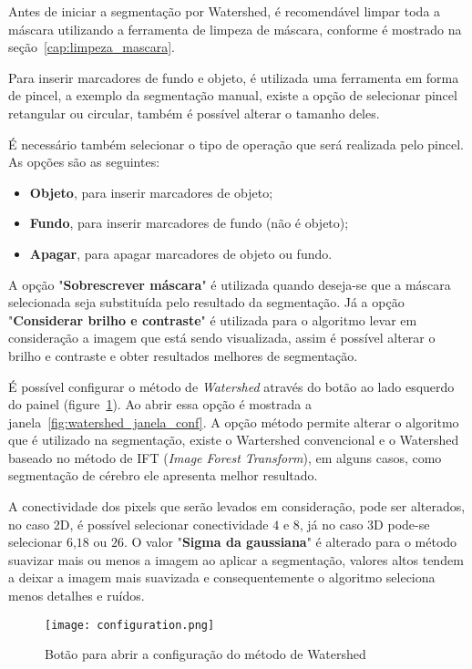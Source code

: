Antes de iniciar a segmentação por Watershed, é recomendável limpar toda a máscara utilizando a ferramenta de limpeza de máscara, conforme é mostrado na seção~\ref{cap:limpeza_mascara}.

Para inserir marcadores de fundo e objeto, é utilizada uma ferramenta em forma de pincel, a exemplo da segmentação manual, existe a opção de selecionar pincel retangular ou circular, também é possível alterar o tamanho deles. 

É necessário também selecionar o tipo de operação que será realizada pelo pincel. As opções são as
seguintes:
\begin{itemize}
\item \textbf{Objeto}, para inserir marcadores de objeto;
\item \textbf{Fundo}, para inserir marcadores de fundo (não é objeto);
\item \textbf{Apagar}, para apagar marcadores de objeto ou fundo.
\end{itemize}

A opção "\textbf{Sobrescrever máscara}" é utilizada quando deseja-se que a máscara selecionada seja substituída pelo resultado da segmentação. Já a opção "\textbf{Considerar brilho e contraste}" é utilizada para o algoritmo levar em consideração a imagem que está sendo visualizada, assim é possível alterar o brilho e contraste e obter resultados melhores de segmentação.

É possível configurar o método de \textit{Watershed} através do botão ao lado esquerdo do painel (figure~\ref{fig:watershed_conf}). Ao abrir essa opção é mostrada a janela~\ref{fig:watershed_janela_conf}. A opção método permite alterar o algoritmo que é utilizado na segmentação, existe o Wartershed convencional e o Watershed baseado no método de IFT (\textit{Image Forest Transform}), em alguns casos, como segmentação de cérebro ele apresenta melhor resultado.

A conectividade dos pixels que serão levados em consideração, pode ser alterados, no caso 2D, é possível selecionar conectividade $4$ e $8$, já no caso 3D pode-se selecionar $6$,$18$ ou $26$. O valor "\textbf{Sigma da gaussiana}" é alterado para o método suavizar mais ou menos a imagem ao aplicar a segmentação, valores altos tendem a deixar a imagem mais suavizada e consequentemente o algoritmo seleciona menos detalhes e ruídos.

\begin{figure}[!htb]
\centering
\texttt{[image: configuration.png]}
\caption{Botão para abrir a configuração do método de Watershed}
\label{fig:watershed_conf}
\end{figure}

